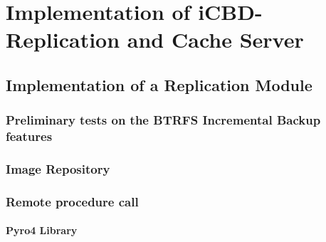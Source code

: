 \chapter{Implementation of iCBD-Replication and Cache Server}
\label{cha:replication}


\section{Implementation of a Replication Module}
\label{sec:replication_impl}


\subsection{Preliminary tests on the BTRFS Incremental Backup features}
\label{sub:pre_test_btrfs}


\subsection{Image Repository}
\label{sub:rep_image_repo}


\subsection{Remote procedure call}
\label{sub:rep_rpcs}


\subsubsection{Pyro4 Library}
\label{subsub:rep_pyro4}


